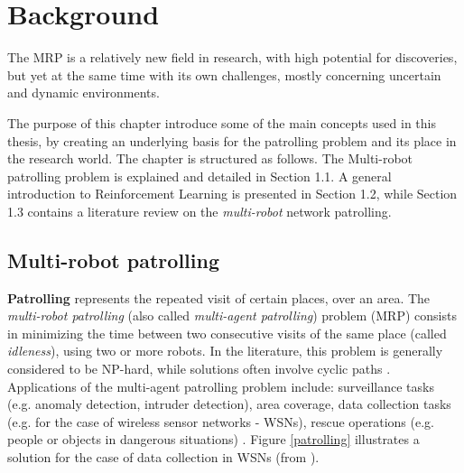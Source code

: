 \chapter{Background}\label{bck}


The MRP is a relatively new field in research, with high potential for discoveries, but yet at the same time with its own challenges, mostly concerning uncertain and dynamic environments.
\par The purpose of this chapter  introduce some of the main concepts used in this thesis, by creating an underlying basis for the patrolling problem and its place in the research world. The chapter is structured as follows. The Multi-robot patrolling problem is explained and detailed in Section 1.1. A general introduction to Reinforcement Learning is presented in Section 1.2, while Section 1.3 contains a literature review on the \emph{multi-robot} network patrolling.

\section{Multi-robot patrolling}

\textbf{Patrolling} represents the repeated visit of certain places, over an area. The \emph{multi-robot patrolling} (also called \textit{multi-agent patrolling}) problem (MRP) consists in minimizing the time between two consecutive visits of the same place (called \emph{idleness}), using two or more robots. In the literature, this problem is generally considered to be NP-hard, while solutions often involve cyclic paths \cite{3,4}. Applications of the multi-agent patrolling problem include: surveillance tasks (e.g. anomaly detection, intruder detection), area coverage, data collection tasks (e.g. for the case of wireless sensor networks - WSNs), rescue operations (e.g. people or objects in dangerous situations) \cite{1,2}.  Figure \ref{patrolling} illustrates a solution for the case of data collection in WSNs (from \cite{8}).

